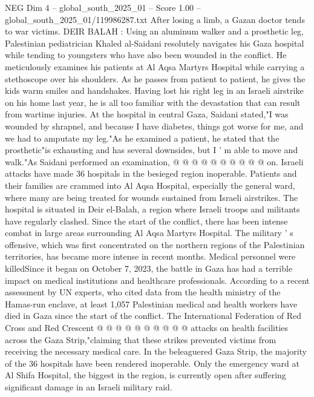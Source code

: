\begin{textsample}{NEG Dim 4 – global\_south\_2025\_01 – Score 1.00 – global\_south\_2025\_01/119986287.txt}  \label{ex:f4_neg_445}
After losing a limb, a Gazan doctor tends to war victims.
DEIR BALAH : Using an aluminum walker and a prosthetic leg, Palestinian pediatrician Khaled al-Saidani resolutely navigates his Gaza hospital while tending to youngsters who have also been wounded in the conflict.
He meticulously examines his patients at Al Aqsa Martyrs Hospital while carrying a stethoscope over his shoulders.
As he passes from patient to patient, he gives the kids warm smiles and handshakes.
Having lost his right leg in an Israeli airstrike on his home last year, he is all too familiar with the devastation that can result from wartime injuries.
At the hospital in central Gaza, Saidani stated,"I was wounded by shrapnel, and because I have diabetes, things got worse for me, and we had to amputate my leg."As he examined a patient, he stated that the prosthetic"is exhausting and has several downsides, but I ' m able to move and walk."As Saidani performed an examination, @ @ @ @ @ @ @ @ @ @ on.
Israeli attacks have made 36 hospitals in the besieged region inoperable.
Patients and their families are crammed into Al Aqsa Hospital, especially the general ward, where many are being treated for wounds sustained from Israeli airstrikes.
The hospital is situated in Deir el-Balah, a region where Israeli troops and militants have regularly clashed.
Since the start of the conflict, there has been intense combat in large areas surrounding Al Aqsa Martyrs Hospital.
The military ' s offensive, which was first concentrated on the northern regions of the Palestinian territories, has became more intense in recent months.
Medical personnel were killedSince it began on October 7, 2023, the battle in Gaza has had a terrible impact on medical institutions and healthcare professionals.
According to a recent assessment by UN experts, who cited data from the health ministry of the Hamas-run enclave, at least 1,057 Palestinian medical and health workers have died in Gaza since the start of the conflict.
The International Federation of Red Cross and Red Crescent @ @ @ @ @ @ @ @ @ @ attacks on health facilities across the Gaza Strip,"claiming that these strikes prevented victims from receiving the necessary medical care.
In the beleaguered Gaza Strip, the majority of the 36 hospitals have been rendered inoperable.
Only the emergency ward at Al Shifa Hospital, the biggest in the region, is currently open after suffering significant damage in an Israeli military raid.

\end{textsample}
